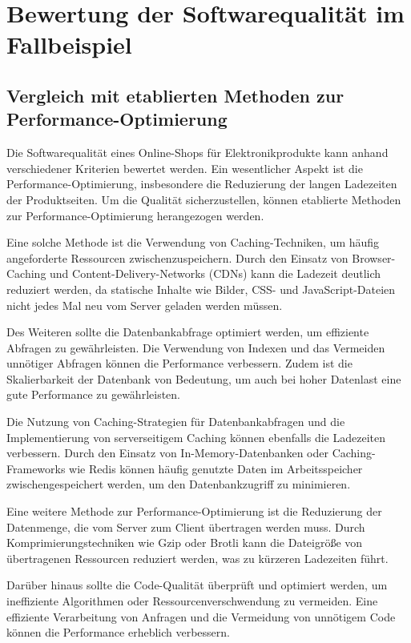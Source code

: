 \section{Bewertung der Softwarequalität im Fallbeispiel}

\subsection{Vergleich mit etablierten Methoden zur Performance-Optimierung}

Die Softwarequalität eines Online-Shops für Elektronikprodukte kann anhand verschiedener Kriterien bewertet werden. Ein wesentlicher Aspekt ist die Performance-Optimierung, insbesondere die Reduzierung der langen Ladezeiten der Produktseiten. Um die Qualität sicherzustellen, können etablierte Methoden zur Performance-Optimierung herangezogen werden.

Eine solche Methode ist die Verwendung von Caching-Techniken, um häufig angeforderte Ressourcen zwischenzuspeichern. Durch den Einsatz von Browser-Caching und Content-Delivery-Networks (CDNs) kann die Ladezeit deutlich reduziert werden, da statische Inhalte wie Bilder, CSS- und JavaScript-Dateien nicht jedes Mal neu vom Server geladen werden müssen.

Des Weiteren sollte die Datenbankabfrage optimiert werden, um effiziente Abfragen zu gewährleisten. Die Verwendung von Indexen und das Vermeiden unnötiger Abfragen können die Performance verbessern. Zudem ist die Skalierbarkeit der Datenbank von Bedeutung, um auch bei hoher Datenlast eine gute Performance zu gewährleisten.

Die Nutzung von Caching-Strategien für Datenbankabfragen und die Implementierung von serverseitigem Caching können ebenfalls die Ladezeiten verbessern. Durch den Einsatz von In-Memory-Datenbanken oder Caching-Frameworks wie Redis können häufig genutzte Daten im Arbeitsspeicher zwischengespeichert werden, um den Datenbankzugriff zu minimieren.

Eine weitere Methode zur Performance-Optimierung ist die Reduzierung der Datenmenge, die vom Server zum Client übertragen werden muss. Durch Komprimierungstechniken wie Gzip oder Brotli kann die Dateigröße von übertragenen Ressourcen reduziert werden, was zu kürzeren Ladezeiten führt.

Darüber hinaus sollte die Code-Qualität überprüft und optimiert werden, um ineffiziente Algorithmen oder Ressourcenverschwendung zu vermeiden. Eine effiziente Verarbeitung von Anfragen und die Vermeidung von unnötigem Code können die Performance erheblich verbessern.

